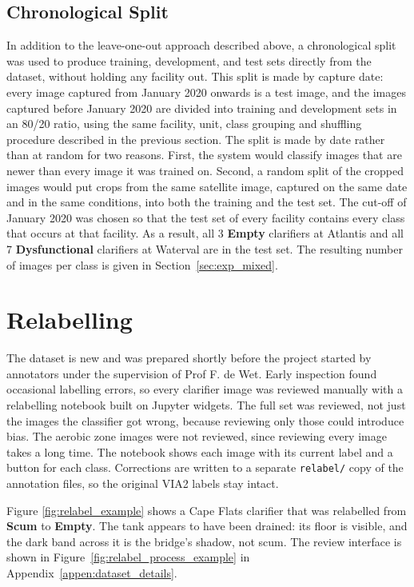\subsection{Chronological Split}
In addition to the leave-one-out approach described above, a chronological split was used to produce training, development, and test sets directly from the dataset, without holding any facility out. This split is made by capture date: every image captured from January 2020 onwards is a test image, and the images captured before January 2020 are divided into training and development sets in an 80/20 ratio, using the same facility, unit, class grouping and shuffling procedure described in the previous section. The split is made by date rather than at random for two reasons. First, the system would classify images that are newer than every image it was trained on. Second, a random split of the cropped images would put crops from the same satellite image, captured on the same date and in the same conditions, into both the training and the test set. The cut-off of January 2020 was chosen so that the test set of every facility contains every class that occurs at that facility. As a result, all 3 \textbf{Empty} clarifiers at Atlantis and all 7 \textbf{Dysfunctional} clarifiers at Waterval are in the test set. The resulting number of images per class is given in Section~\ref{sec:exp_mixed}.

\section{Relabelling}

The dataset is new and was prepared shortly before the project started by annotators under the supervision of Prof F. de Wet. Early inspection found occasional labelling errors, so every clarifier image was reviewed manually with a relabelling notebook built on Jupyter widgets. The full set was reviewed, not just the images the classifier got wrong, because reviewing only those could introduce bias. The aerobic zone images were not reviewed, since reviewing every image takes a long time. The notebook shows each image with its current label and a button for each class. Corrections are written to a separate \texttt{relabel/} copy of the annotation files, so the original VIA2 labels stay intact.

Figure \ref{fig:relabel_example} shows a Cape Flats clarifier that was relabelled from \textbf{Scum} to \textbf{Empty}. The tank appears to have been drained: its floor is visible, and the dark band across it is the bridge's shadow, not scum. The review interface is shown in Figure~\ref{fig:relabel_process_example} in Appendix~\ref{appen:dataset_details}.

